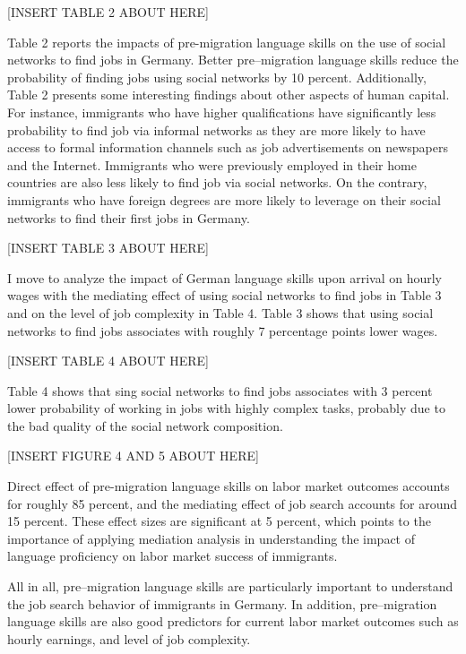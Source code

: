 \documentclass[12pt,a4paper]{article}
\begin{document}
\begin{center}
[INSERT TABLE 2 ABOUT HERE]
\end{center}

Table 2 reports the impacts of pre-migration language skills on the use of social networks to find jobs in Germany. Better pre--migration language skills reduce the probability of finding jobs using social networks by 10 percent. Additionally, Table 2 presents some interesting findings about other aspects of human capital. For instance, immigrants who have higher qualifications have significantly less probability to find job via informal networks as they are more likely to have access to formal information channels such as job advertisements on newspapers and the Internet. Immigrants who were previously employed in their home countries are also less likely to find job via social networks. On the contrary, immigrants who have foreign degrees are more likely to leverage on their social networks to find their first jobs in Germany.

\begin{center}
[INSERT TABLE 3 ABOUT HERE]
\end{center}

I move to analyze the impact of German language skills upon arrival on hourly wages with the mediating effect of using social networks to find jobs in Table 3 and on the level of job complexity in Table 4. Table 3 shows that using social networks to find jobs associates with roughly 7 percentage points lower wages.

\begin{center}
[INSERT TABLE 4 ABOUT HERE]
\end{center}
Table 4 shows that sing social networks to find jobs associates with 3 percent lower probability of working in jobs with highly complex tasks, probably due to the bad quality of the social network composition. 

\begin{center}
[INSERT FIGURE 4 AND 5 ABOUT HERE]
\end{center}

Direct effect of pre-migration language skills on labor market outcomes accounts for roughly 85 percent, and the mediating effect of job search accounts for around 15 percent. These effect sizes are significant at 5 percent, which points to the importance of applying mediation analysis in understanding the impact of language proficiency on labor market success of immigrants. 

All in all, pre--migration language skills are particularly important to understand the job search behavior of immigrants in Germany. In addition, pre--migration language skills are also good predictors for current labor market outcomes such as hourly earnings, and level of job complexity.
\end{document}
